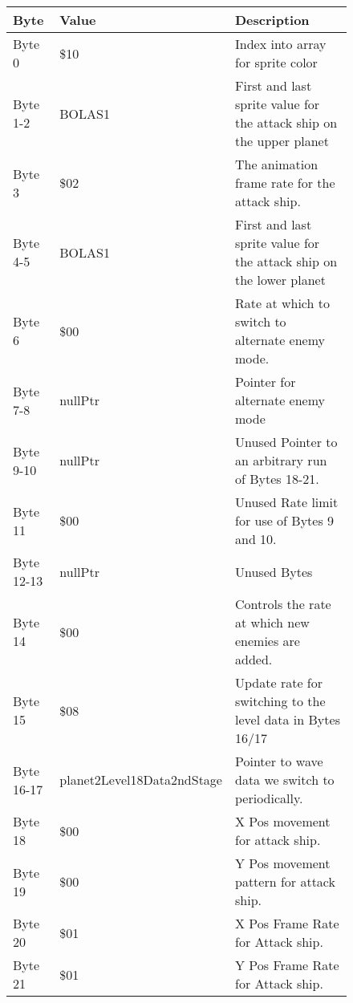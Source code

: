 \begin{figure}[H]
{\begin{adjustbox}{width=12cm}
\begin{tabular}{lll}
\toprule
 Byte       & Value                      & Description                                                         \\
\midrule
 Byte 0     & \$10                        & Index into array for sprite color                                   \\
 Byte 1-2   & BOLAS1                     & First and last sprite value for the attack ship on the upper planet \\
 Byte 3     & \$02                        & The animation frame rate for the attack ship.                       \\
 Byte 4-5   & BOLAS1                     & First and last sprite value for the attack ship on the lower planet \\
 Byte 6     & \$00                        & Rate at which to switch to alternate enemy mode.                    \\
 Byte 7-8   & nullPtr                    & Pointer for alternate enemy mode                                    \\
 Byte 9-10  & nullPtr                    & Unused Pointer to an arbitrary run of Bytes 18-21.                  \\
 Byte 11    & \$00                        & Unused Rate limit for use of Bytes 9 and 10.                        \\
 Byte 12-13 & nullPtr                    & Unused Bytes                                                        \\
 Byte 14    & \$00                        & Controls the rate at which new enemies are added.                   \\
 Byte 15    & \$08                        & Update rate for switching to the level data in Bytes 16/17          \\
 Byte 16-17 & planet2Level18Data2ndStage & Pointer to wave data we switch to periodically.                     \\
 Byte 18    & \$00                        & X Pos movement for attack ship.                                     \\
 Byte 19    & \$00                        & Y Pos movement pattern for attack ship.                             \\
 Byte 20    & \$01                        & X Pos Frame Rate for Attack ship.                                   \\
 Byte 21    & \$01                        & Y Pos Frame Rate for Attack ship.                                   \\

\end{tabular}
\end{adjustbox}}
\end{figure}
